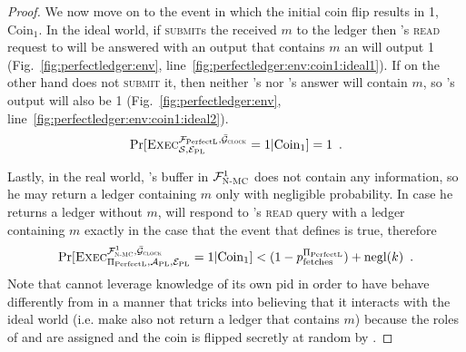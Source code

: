 \begin{proof}
    We now move on to the event in which the initial coin flip results in 1,
    $\mathrm{Coin}_1$. In the ideal world, if \simulator{} \textsc{submit}s the
    received $m$ to the ledger then \environment's \textsc{read} request to
    \bob{} will be answered with an output that contains $m$ an \environment{}
    will output 1 (Fig.~\ref{fig:perfectledger:env},
    line~\ref{fig:perfectledger:env:coin1:ideal1}). If on the other hand
    \simulator{} does not \textsc{submit} it, then neither \bob's nor \alice's
    answer will contain $m$, so \environment's output will also be 1
    (Fig.~\ref{fig:perfectledger:env},
    line~\ref{fig:perfectledger:env:coin1:ideal2}).
    \begin{equation*}
      \Pr[\textsc{Exec}^{\mathcal{F}_{\mathrm{PerfectL}}, \bar{\mathcal{G}}_{\textsc{clock}}}_{\mathcal{S}, \mathcal{E}_{\mathrm{PL}}} = 1
      | \mathrm{Coin}_1] = 1 \enspace.
    \end{equation*}

    Lastly, in the real world, \bob's buffer in $\mathcal{F}_{\textsc{N-MC}}^1$ does not
    contain any information, so he may return a ledger containing $m$ only with
    negligible probability. In case he returns a ledger without $m$, \alice{}
    will respond to \environment's \textsc{read} query with a ledger containing
    $m$ exactly in the case that the event that defines \ppfetches{} is true,
    therefore
    \begin{equation*}
      \Pr[\textsc{Exec}^{\mathcal{F}_{\textsc{N-MC}}^1, \bar{\mathcal{G}}_{\textsc{clock}}}_{\Pi_{\mathrm{PerfectL}}, \mathcal{A}_{\mathrm{PL}},
      \mathcal{E}_{\mathrm{PL}}} = 1 | \mathrm{Coin}_1] < (1 - p^{\Pi_{\mathrm{PerfectL}}}_{\mathrm{fetches}}) + \text{negl}(k)
      \enspace.
    \end{equation*}
    Note that \perfectprot{} cannot leverage knowledge of its own pid in order
    to have \alice{} behave differently from \bob{} in a manner that tricks
    \perfectenv{} into believing that it interacts with the ideal world (i.e.
    make \alice{} also not return a ledger that contains $m$) because the roles
    of \alice{} and \bob{} are assigned and the coin is flipped secretly at
    random by \perfectenv.


\end{proof}
